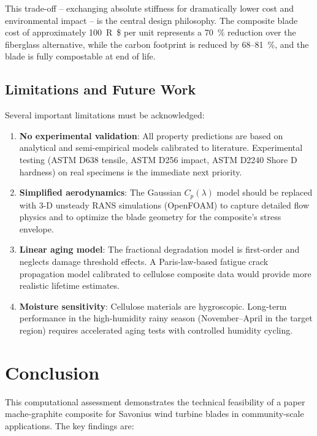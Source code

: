 \documentclass[twocolumn]{article}
\newcommand{\BrazilianReal}{R\$}
\begin{document}
This trade-off -- exchanging absolute stiffness for dramatically lower cost and environmental impact -- is the central design philosophy. The composite blade cost of approximately \SI{100}{\BrazilianReal} per unit represents a 70~\% reduction over the fiberglass alternative, while the carbon footprint is reduced by 68--81~\%, and the blade is fully compostable at end of life.

\subsection{Limitations and Future Work}

Several important limitations must be acknowledged:

\begin{enumerate}
    \item \textbf{No experimental validation}: All property predictions are based on analytical and semi-empirical models calibrated to literature. Experimental testing (ASTM D638 tensile, ASTM D256 impact, ASTM D2240 Shore D hardness) on real specimens is the immediate next priority.
    \item \textbf{Simplified aerodynamics}: The Gaussian $C_p(\lambda)$ model should be replaced with 3-D unsteady RANS simulations (OpenFOAM) to capture detailed flow physics and to optimize the blade geometry for the composite's stress envelope.
    \item \textbf{Linear aging model}: The fractional degradation model is first-order and neglects damage threshold effects. A Paris-law-based fatigue crack propagation model calibrated to cellulose composite data would provide more realistic lifetime estimates.
    \item \textbf{Moisture sensitivity}: Cellulose materials are hygroscopic. Long-term performance in the high-humidity rainy season (November--April in the target region) requires accelerated aging tests with controlled humidity cycling.
\end{enumerate}

\section{Conclusion}

This computational assessment demonstrates the technical feasibility of a paper mache-graphite composite for Savonius wind turbine blades in community-scale applications. The key findings are:
\end{document}
